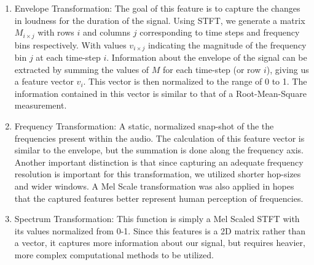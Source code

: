 \documentclass{nime-alternate} %
\begin{document}
\begin{enumerate}
\item Envelope Transformation: The goal of this feature is to capture the changes in loudness for the duration of the signal. Using STFT, we generate a matrix $M_{i \times j}$ with rows $i$ and columns $j$ corresponding to time steps and frequency bins respectively. With values $v_{i \times j}$ indicating the magnitude of the frequency bin $j$ at each time-step $i$. Information about the envelope of the signal can be extracted by summing the values of $M$ for each time-step (or row $i$), giving us a feature vector $v_i$. This vector is then normalized to the range of 0 to 1. The information contained in this vector is similar to that of a Root-Mean-Square measurement.
\item Frequency Transformation: A static, normalized snap-shot of the the frequencies present within the audio. The calculation of this feature vector is similar to the envelope, but the summation is done along the frequency axis. Another important distinction is that since capturing an adequate frequency resolution is important for this transformation, we utilized shorter hop-sizes and wider windows. A Mel Scale transformation was also applied in hopes that the captured features better represent human perception of frequencies. 
\item Spectrum Transformation: This function is simply a Mel Scaled STFT with its values normalized from 0-1. Since this features is a 2D matrix rather than a vector, it captures more information about our signal, but requires heavier, more complex computational methods to be utilized. 
\end{enumerate}   
\end{document}
